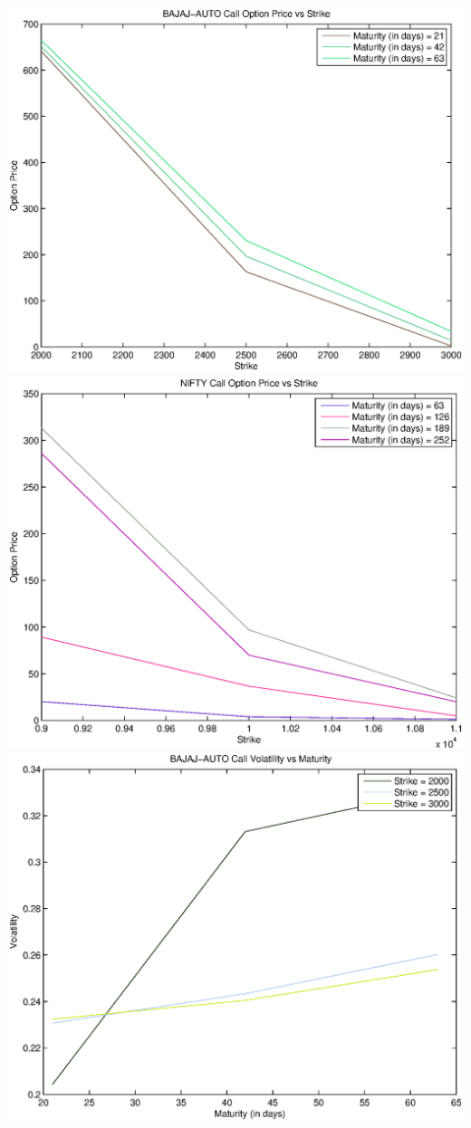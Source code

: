 \documentclass{article}
\begin{document}
\includegraphics[width=\textwidth]{BAJAJ-AUTO_Call_Option_Price_vs_Strike} \\              
\includegraphics[width=\textwidth]{NIFTY_Call_Option_Price_vs_Strike} \\
\includegraphics[width=\textwidth]{BAJAJ-AUTO_Call_Volatility_vs_Maturity} \\              
\end{document}
